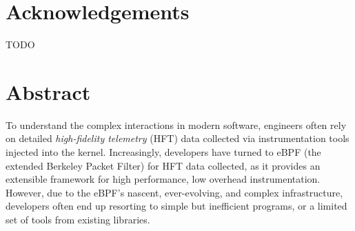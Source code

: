 \documentclass[11pt,a4paper]{article}
\begin{document}
\tableofcontents
\newpage

\section*{Acknowledgements}

TODO




\newpage

\section*{Abstract}

To understand the complex interactions in modern software, engineers often rely on detailed
\textit{high-fidelity telemetry} (HFT) data collected via instrumentation tools injected into the
kernel. Increasingly, developers have turned to eBPF (the extended Berkeley Packet Filter) for HFT
data collected, as it provides an extensible framework for high performance, low overhead
instrumentation. However, due to the eBPF's nascent, ever-evolving, and complex infrastructure,
developers often end up resorting to simple but inefficient programs, or a limited set of tools from
existing libraries.
\end{document}
